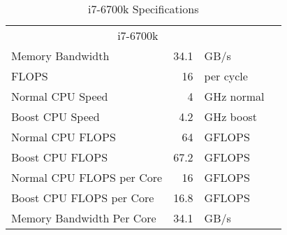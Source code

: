 \begin{table}[htbp]
	\centering
	\caption{i7-6700k Specifications}
	\begin{tabular}{lrlr}
		\multicolumn{3}{c}{i7-6700k} &  \\
		Memory Bandwidth          & 34.1 & GB/s       &   \\
		FLOPS                     & 16   & per cycle  &   \\
		Normal CPU Speed          & 4    & GHz normal &   \\
		Boost CPU Speed           & 4.2  & GHz boost  &   \\
		Normal CPU FLOPS          & 64   & GFLOPS     &   \\
		Boost CPU FLOPS           & 67.2 & GFLOPS     &   \\
		Normal CPU FLOPS per Core & 16   & GFLOPS     &   \\
		Boost CPU FLOPS per Core  & 16.8 & GFLOPS     &   \\
		Memory Bandwidth Per Core & 34.1 & GB/s       &   \\
	\end{tabular}%
	\label{tab:addlabel}%
\end{table}%